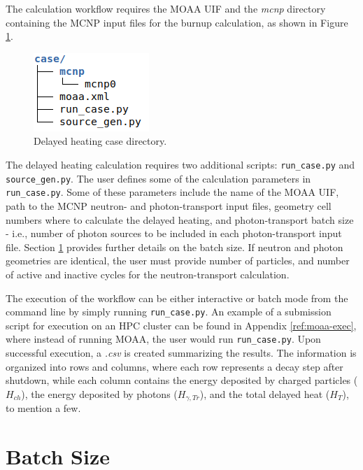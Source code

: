 \label{ap:mcnp_fixed}

The calculation workflow requires the MOAA UIF and the \textit{mcnp} directory containing the MCNP input files for the burnup calculation, as shown in Figure \ref{fig:tree2}.

\begin{figure}[htbp!]
  \begin{center}
    \includegraphics[width=0.23\linewidth]{figures/dh_case_directory}
  \end{center}
  \caption{Delayed heating case directory.}
  \label{fig:tree2}
\end{figure}

The delayed heating calculation requires two additional scripts: \texttt{run\_case.py} and \texttt{source\_gen.py}.
The user defines some of the calculation parameters in \texttt{run\_case.py}.
Some of these parameters include the name of the MOAA UIF, path to the MCNP neutron- and photon-transport input files, geometry cell numbers where to calculate the delayed heating, and photon-transport batch size - i.e., number of photon sources to be included in each photon-transport input file.
Section \ref{ap:batchsize} provides further details on the batch size.
If neutron and photon geometries are identical, the user must provide number of particles, and number of active and inactive cycles for the neutron-transport calculation.

The execution of the workflow can be either interactive or batch mode from the command line by simply running \texttt{run\_case.py}.
An example of a submission script for execution on an \gls*{HPC} cluster can be found in Appendix \ref{ref:moaa-exec}, where instead of running MOAA, the user would run \texttt{run\_case.py}.
Upon successful execution, a \textit{.csv} is created summarizing the results.
The information is organized into rows and columns, where each row represents a decay step after shutdown, while each column contains the energy deposited by charged particles ($H_{ch}$), the energy deposited by photons ($H_{\gamma, Tr}$), and the total delayed heat ($H_T$), to mention a few.

\section{Batch Size}
\label{ap:batchsize}

